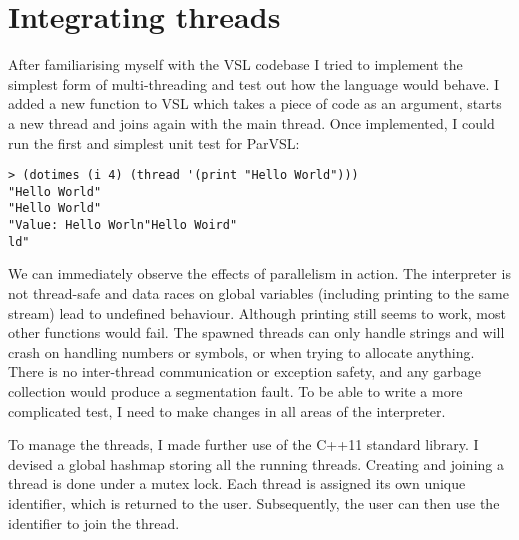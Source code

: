 \section{Integrating threads}
\label{sec:babythreads}
After familiarising myself with the VSL codebase I tried to implement the simplest form of
multi-threading and test out how the language would behave. I added a new function to VSL
which takes a piece of code as an argument, starts a new thread and joins again with
the main thread. Once implemented, I could run the first and simplest unit test for ParVSL:

\begin{verbatim}
> (dotimes (i 4) (thread '(print "Hello World")))
"Hello World"
"Hello World"
"Value: Hello Worln"Hello Woird"
ld"
\end{verbatim}

We can immediately observe the effects of parallelism in action. The interpreter is not thread-safe and data races
on global variables (including printing to the same stream) lead to undefined behaviour. Although printing
still seems to work, most other functions would fail. The spawned threads can only handle strings
and will crash on handling numbers or symbols, or when trying to allocate anything.
There is no inter-thread communication or exception safety, and any garbage collection would produce a segmentation
fault. To be able to write a more complicated test, I need to make changes in all areas of the interpreter.

To manage the threads, I made further use of the C++11 standard library. I devised a global hashmap storing
all the running threads. Creating and joining a thread is done under a mutex lock. Each thread is assigned its own unique
identifier, which is returned to the user. Subsequently, the user can then use the identifier to join the thread.



